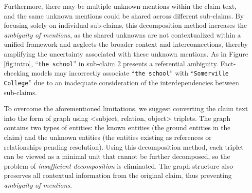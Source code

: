 Furthermore, there may be multiple unknown mentions within the claim text, and the same unknown mentions could be shared across different sub-claims. By focusing solely on individual sub-claims, this decomposition method increases the {\it ambiguity of mentions}, as the shared unknowns are not contextualized within a unified framework and neglects the broader context and interconnections, thereby amplifying the uncertainty associated with these unknown mentions. As in Figure \ref{fig:intro}, ``{\tt the school}'' in sub-claim 2 presents a referential ambiguity. Fact-checking models may incorrectly associate ``{\tt the school}'' with ``{\tt Somerville College}'' due to an inadequate consideration of the interdependencies between sub-claims.

To overcome the aforementioned limitations, we suggest converting the claim text into the form of graph using <subject, relation, object> triplets. The graph contains two types of entities: the known entities (the ground entities in the claim) and the unknown entities (the entities existing as references or relationships pending resolution). Using this decomposition method, each triplet can be viewed as a minimal unit that cannot be further decomposed, so the problem of \textit{insufficient decomposition} is eliminated. The graph structure also preserves all contextual information from the original claim, thus preventing \textit{ambiguity of mentions}. 

